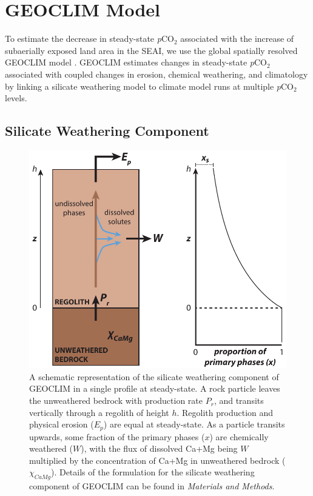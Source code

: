 \documentclass[9pt,twocolumn,twoside,lineno]{pnas-new}
\newcommand{\pCOtwo}{\textit{p}CO$_{2}$\xspace}
\newcommand{\MM}{\textit{Materials and Methods}\xspace}
\begin{document}
\section*{GEOCLIM Model}

To estimate the decrease in steady-state \pCOtwo associated with the increase of subaerially exposed land area in the SEAI, we use the global spatially resolved GEOCLIM model \cite{Godderis2017c}. GEOCLIM estimates changes in steady-state \pCOtwo associated with coupled changes in erosion, chemical weathering, and climatology by linking a silicate weathering model to climate model runs at multiple \pCOtwo levels.

\subsection*{Silicate Weathering Component}

\begin{figure}[h]
    \centering
    \includegraphics[width=1\linewidth]{Figures/regolith_schematic.pdf}
    \caption{A schematic representation of the silicate weathering component of GEOCLIM in a single profile at steady-state. A rock particle leaves the unweathered bedrock with production rate $P_{r}$, and transits vertically through a regolith of height $h$. Regolith production and physical erosion ($E_{p}$) are equal at steady-state. As a particle transits upwards, some fraction of the primary phases ($x$) are chemically weathered ($W$), with the flux of dissolved Ca+Mg being $W$ multiplied by the concentration of Ca+Mg in unweathered bedrock ($\chi_{CaMg}$). Details of the formulation for the silicate weathering component of GEOCLIM can be found in \MM.}
    \label{fig:regolith_schematic}
\end{figure}
\end{document}
